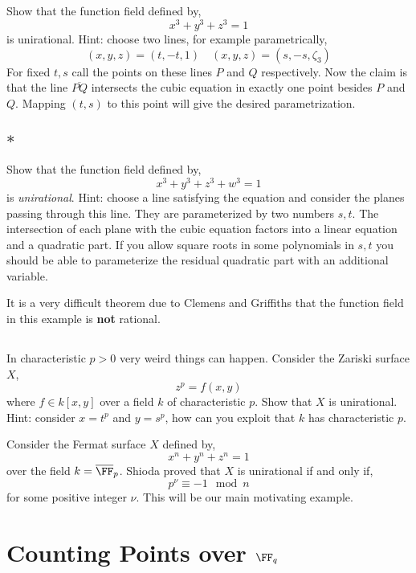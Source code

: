 \documentclass[12pt]{article}
\begin{document}
\subsection{}
Show that the function field defined by,
\[ x^3 + y^3 + z^3 = 1 \]
is unirational. Hint: choose two lines, for example parametrically,
\[ (x,y,z) = (t,-t,1) \quad (x,y,z) = (s, -s, \zeta_3) \]
For fixed $t,s$ call the points on these lines $P$ and $Q$ respectively. Now the claim is that the line $\overline{PQ}$ intersects the cubic equation in exactly one point besides $P$ and $Q$. Mapping $(t,s)$ to this point will give the desired parametrization. 

\subsection{$\ast$}

Show that the function field defined by,
\[ x^3 + y^3 + z^3 + w^3 = 1 \]
is \textit{unirational}. Hint: choose a line satisfying the equation and consider the planes passing through this line. They are parameterized by two numbers $s,t$. The intersection of each plane with the cubic equation factors into a linear equation and a quadratic part. If you allow square roots in some polynomials in $s,t$ you should be able to parameterize the residual quadratic part with an additional variable. 
\par
It is a very difficult theorem due to Clemens and Griffiths that the function field in this example is \textbf{not} rational.

\subsection{}

In characteristic $p > 0$ very weird things can happen. Consider the Zariski surface $X$,
\[ z^p = f(x,y) \]
where $f \in k[x,y]$ over a field $k$ of characteristic $p$. Show that $X$ is unirational. Hint: consider $x = t^p$ and $y = s^p$, how can you exploit that $k$ has characteristic $p$.

\begin{example}
Consider the Fermat surface $X$ defined by,
\[ x^n + y^n + z^n = 1 \]
over the field $k = \overline{\FF}_p$. Shioda proved \cite[Theorem III]{shioda_fermat} that $X$ is unirational if and only if,
\[ p^\nu \equiv -1 \mod n \]
for some positive integer $\nu$. This will be our main motivating example.
\end{example}

\section{Counting Points over $\FF_q$}
\end{document}
